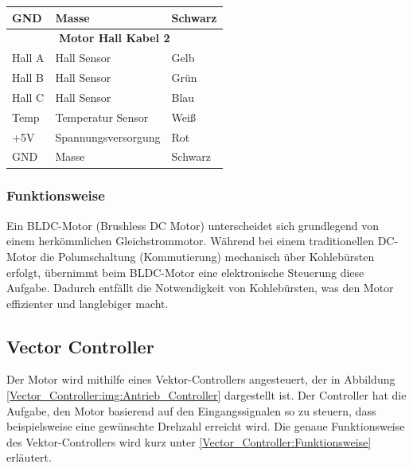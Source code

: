 \begin{table}[!ht]
\begin{tabular}{lll}
		\multicolumn{1}{l|}{GND}    & Masse                   & Schwarz        \\ \hline
		\multicolumn{3}{c}{\textbf{Motor Hall Kabel 2}}                        \\ \hline
		\multicolumn{1}{l|}{Hall A} & Hall Sensor             & Gelb           \\
		\multicolumn{1}{l|}{Hall B} & Hall Sensor             & Grün           \\
		\multicolumn{1}{l|}{Hall C} & Hall Sensor             & Blau           \\
		\multicolumn{1}{l|}{Temp}   & Temperatur Sensor       & Weiß           \\
		\multicolumn{1}{l|}{+5V}    & Spannungsversorgung     & Rot            \\
		\multicolumn{1}{l|}{GND}    & Masse                   & Schwarz        \\ \hline
	\end{tabular}
\end{table}
\pagebreak[4]



\subsubsection{Funktionsweise}
\label{BLDC_Motor:Funktionsweise}
Ein BLDC-Motor (Brushless DC Motor) unterscheidet sich grundlegend von einem herkömmlichen Gleichstrommotor. Während bei einem traditionellen DC-Motor die Polumschaltung (Kommutierung) mechanisch über Kohlebürsten erfolgt, übernimmt beim BLDC-Motor eine elektronische Steuerung diese Aufgabe. Dadurch entfällt die Notwendigkeit von Kohlebürsten, was den Motor effizienter und langlebiger macht\cite{mathworks:bldc_motor}.
\newpage



\subsection{Vector Controller}
\label{section:Vector_Controller}

Der Motor wird mithilfe eines Vektor-Controllers angesteuert, der in Abbildung \ref{Vector_Controller:img:Antrieb_Controller} dargestellt ist. Der Controller hat die Aufgabe, den Motor basierend auf den Eingangssignalen so zu steuern, dass beispielsweise eine gewünschte Drehzahl erreicht wird. Die genaue Funktionsweise des Vektor-Controllers wird kurz unter \ref{Vector_Controller:Funktionsweise} erläutert.

